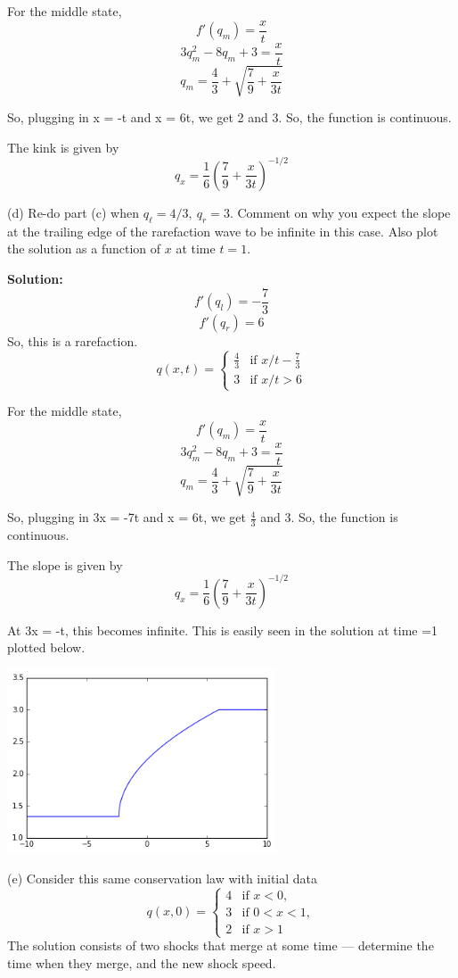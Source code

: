 \documentclass[11pt]{article}
\begin{document}
For the middle state,
\[ f'(q_m) = \frac{x}{t} \]
\[ 3q_m^2 - 8q_m+3 = \frac{x}{t} \]
\[q_m = \frac{4}{3} + \sqrt{\frac{7}{9} + \frac{x}{3t}} \]

So, plugging in x = -t and x = 6t,  we get 2 and 3. So, the function is continuous. 

The kink is given by
\[q_x = \frac{1}{6}  (\frac{7}{9} + \frac{x}{3t})^{-1/2}\]

(d) Re-do part (c) when $q_\ell = 4/3,~ q_r = 3$.  
Comment on why you expect the slope at the trailing edge of the rarefaction
wave to be infinite in this case.
Also plot the solution as a function of $x$ at time $t=1$.

\vskip 1cm
{\bf Solution:}
\[f'(q_l)= -\frac{7}{3}\]
\[f'(q_r)=6\]
So, this is a rarefaction.
\[q(x,t)= \begin{cases}
\frac{4}{3} & \text{if~}x/t-\frac{7}{3}\\          3 & \text{if~} x/t >6
\end{cases}\]

For the middle state,
\[ f'(q_m) = \frac{x}{t} \]
\[ 3q_m^2 - 8q_m+3 = \frac{x}{t} \]
\[q_m = \frac{4}{3} + \sqrt{\frac{7}{9} + \frac{x}{3t}} \]

So, plugging in 3x = -7t and x = 6t,  we get $\frac{4}{3}$ and 3. So, the function is continuous. 

The slope is given by
\[q_x = \frac{1}{6}  (\frac{7}{9} + \frac{x}{3t})^{-1/2}\]

At 3x = -t, this becomes infinite. This is easily seen in the solution at time =1 plotted below.


					\begin{minipage}{\linewidth}
						\centering
						\includegraphics[width=8cm]{solcubic.png}
					\end{minipage}

(e) Consider this same conservation law with initial data
\[
q(x,0) = \begin{cases} 
        4 &\text{if~}x<0,\\ 
        3 &\text{if~}0<x<1,\\
        2 &\text{if~}x>1
         \end{cases}
\]
The solution consists of two shocks that merge at some time --- determine
the time when they merge, and the new shock speed.
\end{document}
